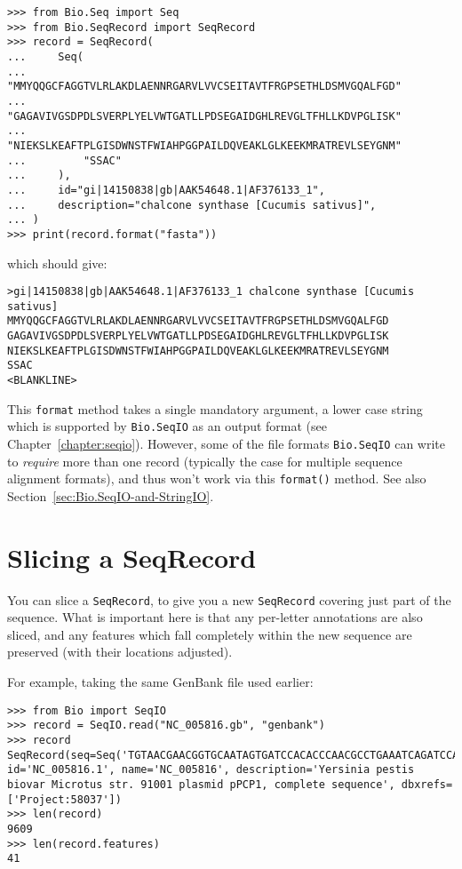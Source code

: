 \begin{verbatim}
>>> from Bio.Seq import Seq
>>> from Bio.SeqRecord import SeqRecord
>>> record = SeqRecord(
...     Seq(
...         "MMYQQGCFAGGTVLRLAKDLAENNRGARVLVVCSEITAVTFRGPSETHLDSMVGQALFGD"
...         "GAGAVIVGSDPDLSVERPLYELVWTGATLLPDSEGAIDGHLREVGLTFHLLKDVPGLISK"
...         "NIEKSLKEAFTPLGISDWNSTFWIAHPGGPAILDQVEAKLGLKEEKMRATREVLSEYGNM"
...         "SSAC"
...     ),
...     id="gi|14150838|gb|AAK54648.1|AF376133_1",
...     description="chalcone synthase [Cucumis sativus]",
... )
>>> print(record.format("fasta"))
\end{verbatim}
\noindent which should give:
\begin{verbatim}
>gi|14150838|gb|AAK54648.1|AF376133_1 chalcone synthase [Cucumis sativus]
MMYQQGCFAGGTVLRLAKDLAENNRGARVLVVCSEITAVTFRGPSETHLDSMVGQALFGD
GAGAVIVGSDPDLSVERPLYELVWTGATLLPDSEGAIDGHLREVGLTFHLLKDVPGLISK
NIEKSLKEAFTPLGISDWNSTFWIAHPGGPAILDQVEAKLGLKEEKMRATREVLSEYGNM
SSAC
<BLANKLINE>
\end{verbatim}

This \verb|format| method takes a single mandatory argument, a lower case string which is
supported by \verb|Bio.SeqIO| as an output format (see Chapter~\ref{chapter:seqio}).
However, some of the file formats \verb|Bio.SeqIO| can write to \emph{require} more than
one record (typically the case for multiple sequence alignment formats), and thus won't
work via this \verb|format()| method.  See also Section~\ref{sec:Bio.SeqIO-and-StringIO}.

\section{Slicing a SeqRecord}
\label{sec:SeqRecord-slicing}

You can slice a \verb|SeqRecord|, to give you a new \verb|SeqRecord| covering just
part of the sequence. What is important
here is that any per-letter annotations are also sliced, and any features which fall
completely within the new sequence are preserved (with their locations adjusted).

For example, taking the same GenBank file used earlier:

\begin{verbatim}
>>> from Bio import SeqIO
>>> record = SeqIO.read("NC_005816.gb", "genbank")
>>> record
SeqRecord(seq=Seq('TGTAACGAACGGTGCAATAGTGATCCACACCCAACGCCTGAAATCAGATCCAGG...CTG'), id='NC_005816.1', name='NC_005816', description='Yersinia pestis biovar Microtus str. 91001 plasmid pPCP1, complete sequence', dbxrefs=['Project:58037'])
>>> len(record)
9609
>>> len(record.features)
41
\end{verbatim}

